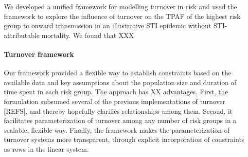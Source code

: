 We developed a unified framework for modelling turnover in risk and
used the framework to explore the influence of turnover on 
the TPAF of the highest risk group to onward transmission in an
illustrative STI epidemic without STI-attributable mortality. 
We found that XXX %



\paragraph{Turnover framework}	%

Our framework %
provided a flexible way to establish constraints based on the available data and
key assumptions about the population size and duration of time spent in each risk group. 
The approach has XX advantages.	%
First, the formulation subsumed several of the previous implementations of turnover [REFS],		%
and thereby hopefully clarifies relationships among them.  %
Second, it facilitates parameterization of turnover among any number of risk groups
in a scalable, flexible way.									%
Finally, the framework makes the parameterization of turnover systems more transparent,
through explicit incorporation of constraints as rows in the linear system.	%


